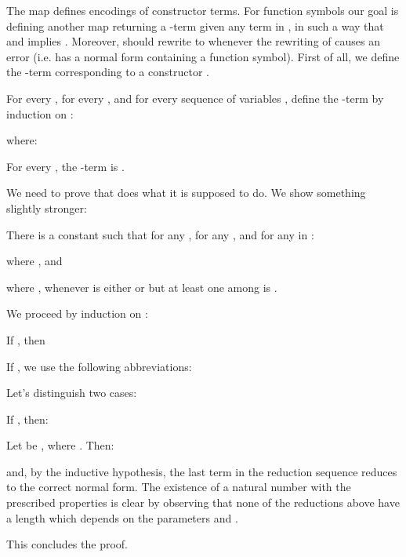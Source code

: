 \documentclass{LMCS}
\newenvironment{varitemize}
{
\begin{list}{\labelitemi}
{\setlength{\itemsep}{0.0mm}
 \setlength{\topsep}{0.0mm}
 \setlength{\parindent}{0.0mm}
 \setlength{\parskip}{0.0mm}
 \setlength{\parsep}{0.0mm}
 \setlength{\partopsep}{0.0mm}
 \setlength{\leftmargin}{15pt}
 \setlength{\labelsep}{5pt}
 \setlength{\labelwidth}{10pt}}}
{
 \end{list} 
}
\newenvironment{varitemizeii}
{
\begin{list}{\labelitemiv}
{\setlength{\itemsep}{0.0mm}
 \setlength{\topsep}{0.0mm}
 \setlength{\parindent}{0.0mm}
 \setlength{\parskip}{0.0mm}
 \setlength{\parsep}{0.0mm}
 \setlength{\partopsep}{0.0mm}
 \setlength{\leftmargin}{15pt}
 \setlength{\labelsep}{5pt}
 \setlength{\labelwidth}{10pt}}}
{
 \end{list} 
}
\newcounter{number}
\begin{document}
\noindent The map  defines encodings of constructor terms.
For function symbols our goal is defining another map  returning
a -term given any term  in , in such
a way that  and  implies
. Moreover,
 should rewrite to  whenever the rewriting of 
causes an error (i.e.  has a normal form containing
a function symbol).
First of all, we define the -term  corresponding
to a constructor .
\newcommand{\conslambda}{\mathit{CON}}
\newcommand{\patlambda}{\mathit{PAT}}
\begin{defi}\label{Def-TRSonetolambdaII}
  \begin{varitemize}
  \item
    For every , for every , and for every
    sequence of variables , 
    define the -term  
    by induction on :
    
    where:
    
  \item
    For every , the -term  is .
  \end{varitemize}
\end{defi}
We need to prove that  does what it is supposed to do. We show something slightly stronger:
\begin{lem}\label{Lemma-TRSonetolambdaII}
There is a constant  such that for any , for any , and for any
 in :

where , and

where , whenever  is either  or 
but at least one among  is .
\end{lem}
\proof
We proceed by induction on :
\begin{varitemize}
\item
  If , then
  
\item
  If , we
  use the following abbreviations:
  
  Let's distinguish two cases:
  \begin{varitemizeii}
  \item
    If , then:
    
  \item
    Let  be ,
    where . 
    Then:
    
    and, by the inductive hypothesis, the last term in the reduction sequence reduces to the correct
    normal form. The existence of a natural number  with the prescribed properties is clear
    by observing that none of the reductions above have a length which depends on the parameters
     and .
  \end{varitemizeii}
\end{varitemize}
This concludes the proof.
\end{document}
